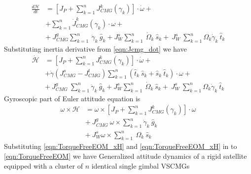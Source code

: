 \begin{equation}
\begin{aligned}
\frac{d\mathcal{H}}{dt} & =\left[ J_{P} +\sum ^{n}_{k=1} J^{k}_{CMG}( \gamma _{k})\right] \cdotp \dot{\omega } +\\
 & +\sum ^{n}_{k=1}\dot{J}^{k}_{CMG}( \gamma _{k}) \cdotp \omega +\\
 & +\ J^{g}_{CMG}\sum ^{n}_{k=1} \ \ddot{\gamma }_{k} \ \hat{g}_{k} +J^{s}_{W}\sum ^{n}_{k=1} \ \dot{\Omega }_{k} \ \hat{s}_{k} +\ J^{s}_{W} \ \sum ^{n}_{k=1} \Omega _{k}\dot{\gamma }_{k} \ \hat{t}_{k}
\end{aligned}
\end{equation}Substituting inertia derivative from \autoref{eqn:Jcmg_dot} we have
\begin{equation}
\begin{aligned}
\dot{\mathcal{H}} & =\left[ J_{P} +\sum ^{n}_{k=1} J^{k}_{CMG}( \gamma _{k})\right] \cdotp \dot{\omega } +\\
 & +\dot{\gamma }\left( J^{s}_{CMG} -J^{t}_{CMG}\right)\sum ^{n}_{k=1}(\hat{t}_{k} \ \hat{s}_{k} +\hat{s}_{k} \ \hat{t}_{k}) \cdotp \omega +\\
 & +\ J^{g}_{CMG} \ \sum ^{n}_{k=1}\ddot{\gamma }_{k} \ \hat{g}_{k} +J^{s}_{W}\sum ^{n}_{k=1} \ \dot{\Omega }_{k} \ \hat{s}_{k} +\ J^{s}_{W} \ \sum ^{n}_{k=1} \Omega _{k}\dot{\gamma }_{k} \ \hat{t}_{k}
\end{aligned}
\label{eqn:TorqueFreeEOM_H}
\end{equation}
Gyroscopic part of Euler attitude equation is
\begin{equation}
\begin{aligned}
\omega \times \mathcal{H} & =\omega \times \left[ J_{P} +\sum ^{n}_{k=1} J^{k}_{CMG}( \gamma _{k})\right] \cdotp \omega \\
 & +\ J^{g}_{CMG} \ \omega \times \sum ^{n}_{k=1}\dot{\gamma }_{k} \ \hat{g}_{k}\\
 & +\ J^{s}_{W} \omega \times \sum ^{n}_{k=1} \ \Omega _{k} \ \hat{s}_{k}
\end{aligned}
\label{eqn:TorqueFreeEOM_xH}
\end{equation}
Substituting \autoref{eqn:TorqueFreeEOM_xH} and \autoref{eqn:TorqueFreeEOM_xH} in to \autoref{eqn:TorqueFreeEOM} we have Generalized attitude dynamics of a rigid satellite equipped with a cluster of $\displaystyle n$ identical single gimbal VSCMGs
